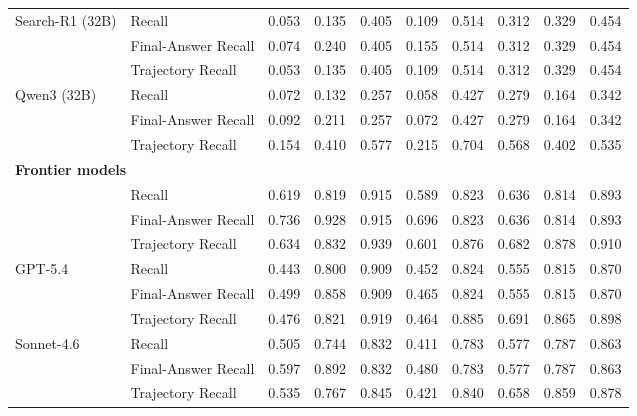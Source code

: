 \documentclass{article}
\begin{document}
\begin{table}[t]
{\begin{tabular}{llcccccccc}
\midrule
\multirow{3}{*}{Search-R1 (32B)}
& Recall               & 0.053 & 0.135 & 0.405 & 0.109 & 0.514 & 0.312 & 0.329 & 0.454 \\
& Final-Answer Recall  & 0.074 & 0.240 & 0.405 & 0.155 & 0.514 & 0.312 & 0.329 & 0.454 \\
& Trajectory Recall    & 0.053 & 0.135 & 0.405 & 0.109 & 0.514 & 0.312 & 0.329 & 0.454 \\
\midrule
\multirow{3}{*}{Qwen3 (32B)}
& Recall               & 0.072 & 0.132 & 0.257 & 0.058 & 0.427 & 0.279 & 0.164 & 0.342 \\
& Final-Answer Recall  & 0.092 & 0.211 & 0.257 & 0.072 & 0.427 & 0.279 & 0.164 & 0.342 \\
& Trajectory Recall    & 0.154 & 0.410 & 0.577 & 0.215 & 0.704 & 0.568 & 0.402 & 0.535 \\
\midrule
\multicolumn{10}{l}{\textbf{Frontier models}} \\
\midrule
\rowcolor{lightblue}
& Recall               & 0.619 & 0.819 & 0.915 & 0.589 & 0.823 & 0.636 & 0.814 & 0.893 \\
\rowcolor{lightblue}
& Final-Answer Recall  & 0.736 & 0.928 & 0.915 & 0.696 & 0.823 & 0.636 & 0.814 & 0.893 \\
\rowcolor{lightblue}
\multirow{-3}{*}{Opus-4.6}
& Trajectory Recall    & 0.634 & 0.832 & 0.939 & 0.601 & 0.876 & 0.682 & 0.878 & 0.910 \\
\midrule
\multirow{3}{*}{GPT-5.4}
& Recall               & 0.443 & 0.800 & 0.909 & 0.452 & 0.824 & 0.555 & 0.815 & 0.870 \\
& Final-Answer Recall  & 0.499 & 0.858 & 0.909 & 0.465 & 0.824 & 0.555 & 0.815 & 0.870 \\
& Trajectory Recall    & 0.476 & 0.821 & 0.919 & 0.464 & 0.885 & 0.691 & 0.865 & 0.898 \\
\midrule
\multirow{3}{*}{Sonnet-4.6}
& Recall               & 0.505 & 0.744 & 0.832 & 0.411 & 0.783 & 0.577 & 0.787 & 0.863 \\
& Final-Answer Recall  & 0.597 & 0.892 & 0.832 & 0.480 & 0.783 & 0.577 & 0.787 & 0.863 \\
& Trajectory Recall    & 0.535 & 0.767 & 0.845 & 0.421 & 0.840 & 0.658 & 0.859 & 0.878 \\

\end{tabular}}
\end{table}
\end{document}
